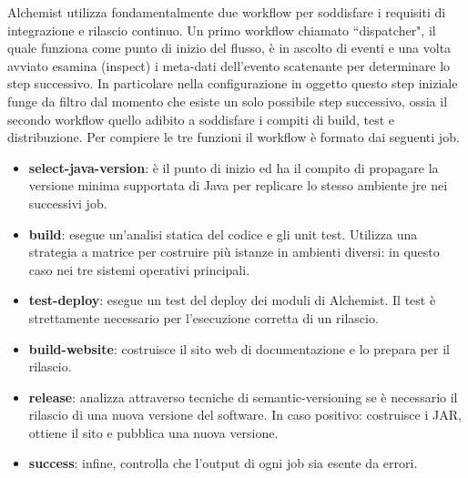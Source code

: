 Alchemist utilizza fondamentalmente due workflow per soddisfare i requisiti di integrazione e rilascio continuo. Un primo workflow chiamato ``dispatcher", il quale funziona come punto di inizio del flusso, è in ascolto di eventi e una volta avviato esamina (inspect) i meta-dati dell'evento scatenante per determinare lo step successivo. In particolare nella configurazione in oggetto questo step iniziale funge da filtro dal momento che esiste un solo possibile step successivo, ossia il secondo workflow quello adibito a soddisfare i compiti di build, test e distribuzione.
Per compiere le tre funzioni il workflow è formato dai seguenti job.
\begin{itemize}
	\item \textbf{select-java-version}: è il punto di inizio ed ha il compito di propagare la versione minima supportata di Java per replicare lo stesso ambiente \ac{jre} nei successivi job.
	\item \textbf{build}: esegue un'analisi statica del codice e gli unit test. Utilizza una strategia a matrice per costruire più istanze in ambienti diversi: in questo caso nei tre sistemi operativi principali. 
	\item \textbf{test-deploy}: esegue un test del deploy dei moduli di Alchemist. Il test è strettamente necessario per l'esecuzione corretta di un rilascio.
	\item \textbf{build-website}: costruisce il sito web di documentazione e lo prepara per il rilascio.
	\item \textbf{release}: analizza attraverso tecniche di semantic-versioning se è necessario il rilascio di una nuova versione del software. In caso positivo: costruisce i JAR, ottiene il sito e pubblica una nuova versione.
	\item \textbf{success}: infine, controlla che l'output di ogni job sia esente da errori.
\end{itemize}

